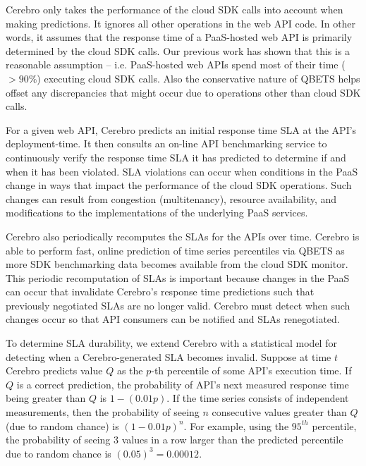 Cerebro only takes the performance of the cloud SDK calls into account
when making predictions. It ignores all other operations in the web API code. In
other words, it assumes that the response time of a PaaS-hosted web API is primarily determined
by the cloud SDK calls. Our previous work has shown that this is a reasonable
assumption -- i.e. PaaS-hosted web APIs spend most of their time ($> 90\%$) executing cloud 
SDK calls. Also the conservative nature of QBETS
helps offset any discrepancies that might occur due to operations other than cloud SDK calls.
 

For a given web API, Cerebro predicts an initial response time SLA
at the API's deployment-time. It then consults an on-line API benchmarking
service to continuously verify the response time SLA it has
predicted to determine if and when it has been violated.
SLA violations can occur when conditions in the PaaS change in
ways that impact the performance of the cloud SDK operations. Such changes can result
from congestion (multitenancy), resource availability, and modifications to
the implementations of the underlying PaaS services. 

Cerebro also periodically recomputes the SLAs for the APIs over time. 
Cerebro is able to perform fast, online
prediction of time series percentiles via QBETS as more SDK benchmarking data becomes 
available from the cloud SDK monitor.
This periodic recomputation of SLAs is important because changes in the PaaS
can occur that invalidate Cerebro's response time predictions such that
previously negotiated SLAs are no longer valid. Cerebro must detect when such
changes occur so that API consumers can be notified and SLAs renegotiated.

To determine SLA durability, we extend Cerebro with a 
statistical model for detecting when a Cerebro-generated SLA becomes invalid. 
Suppose at time $t$ Cerebro predicts value $Q$ as the $p$-th percentile of
some API's execution time.  If $Q$ is a correct prediction,
the probability of API's next measured response time being greater than 
$Q$ is $1-(0.01p)$.  If the time series consists of independent
measurements, then the probability of seeing $n$ consecutive values greater
than $Q$ (due to random chance) is $(1-0.01p)^n$. 
For example, using the $95^{th}$ percentile, the probability of seeing $3$
values in a row larger than the predicted percentile due to random chance
is $(0.05)^3 = 0.00012$.

